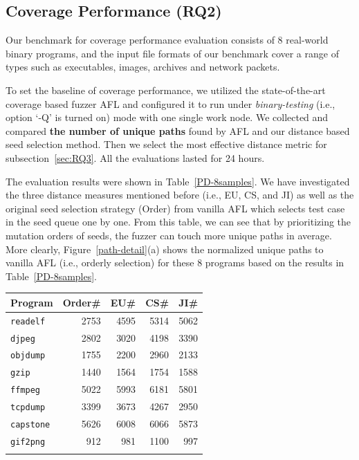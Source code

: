 \subsection{Coverage Performance (RQ2)}\label{sec:RQ2}
Our benchmark for coverage performance evaluation consists of 8 real-world binary programs, and the input file formats of our benchmark cover a range of types such as executables, images, archives and network packets.

To set the baseline of coverage performance, we utilized the state-of-the-art coverage based fuzzer AFL \cite{online:afl} and configured it to run under \textit{binary-testing} (i.e., option `-Q' is turned on) mode with one single work node.
 We collected and compared \textbf{the number of unique paths} found by AFL and our distance based seed selection method.
 Then we select the most effective distance metric for subsection~\ref{sec:RQ3}.
 All the evaluations lasted for 24 hours.

The evaluation results were shown in Table~\ref{PD-8samples}. We have investigated the three distance measures mentioned before (i.e., EU, CS, and JI) as well as the original seed selection strategy (Order) from vanilla AFL which selects test case in the seed queue one by one.
From this table, we can see that by prioritizing the mutation orders of seeds, the fuzzer can touch more unique paths in average.
 More clearly, Figure~\ref{path-detail}(a) shows the normalized unique paths to vanilla AFL (i.e., orderly selection) for these 8 programs based on the results in Table~\ref{PD-8samples}.
\begin{table}[!b]
{\begin{tabular*}{20pc}{@{\extracolsep{\fill}}lrrrr@{}}\toprule
	     Program  & Order\# & EU\# & CS\# & JI\# \\
\midrule
		\texttt{readelf}  &    2753 & 4595 & 5314 & 5062 \\
		 \texttt{djpeg }  &    2802 & 3020 & 4198 & 3390 \\
		\texttt{objdump} &    1755 & 2200 & 2960 & 2133 \\
		 \texttt{gzip }  &    1440 & 1564 & 1754 & 1588 \\
		 \texttt{ffmpeg}  &    5022 & 5993 & 6181 & 5801 \\
		\texttt{tcpdump}  &    3399 & 3673 & 4267 & 2950 \\
		\texttt{capstone} &    5626 & 6008 & 6066 & 5873 \\
		\texttt{gif2png}  &     912 &  981 & 1100 &  997 \\ 
\botrule
\end{tabular*}}{}
\end{table}

